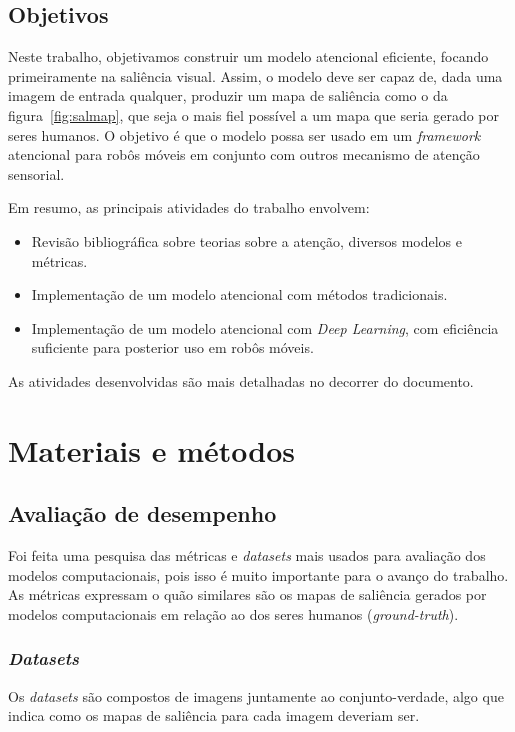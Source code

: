 \documentclass[11pt]{article}
\newcommand{\tit}[1]{\textit{#1}}
\begin{document}
\subsection{Objetivos}
Neste trabalho, objetivamos construir um modelo atencional eficiente, focando
primeiramente na saliência visual.
Assim, o modelo deve ser capaz de, dada uma imagem de entrada qualquer,
produzir um mapa de saliência como o da figura~\ref{fig:salmap}, que seja
o mais fiel possível a um mapa que seria gerado por seres humanos.
O objetivo é que o modelo possa ser usado em um \tit{framework} atencional
para robôs móveis em conjunto com outros mecanismo de atenção sensorial.

Em resumo, as principais atividades do trabalho envolvem:
\begin{itemize}
    \item Revisão bibliográfica sobre teorias sobre a atenção, diversos
        modelos e métricas.
    \item Implementação de um modelo atencional com métodos tradicionais.
    \item Implementação de um modelo atencional com \tit{Deep Learning}, com
        eficiência suficiente para posterior uso em robôs móveis.
\end{itemize}

As atividades desenvolvidas são mais detalhadas no decorrer do documento.

\section{Materiais e métodos}
\subsection{Avaliação de desempenho}
Foi feita uma pesquisa das métricas e \tit{datasets} mais usados para
avaliação dos modelos computacionais, pois isso
é muito importante para o avanço do trabalho.
As métricas expressam o quão similares são os mapas de saliência gerados
por modelos computacionais em relação ao dos seres humanos
(\tit{ground-truth}).

\subsubsection{\tit{Datasets}}
Os \tit{datasets} são compostos de imagens juntamente ao conjunto-verdade,
algo que indica como os mapas de saliência para cada imagem deveriam ser.
\end{document}
